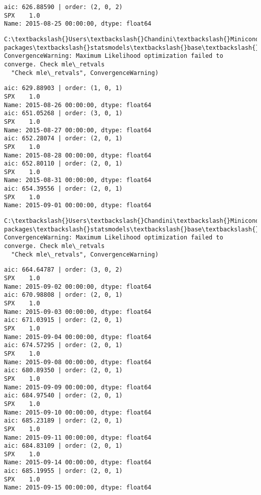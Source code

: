 \documentclass[11pt]{article}
\begin{document}
    \begin{Verbatim}[commandchars=\\\{\}]
aic: 626.88590 | order: (2, 0, 2)
SPX    1.0
Name: 2015-08-25 00:00:00, dtype: float64

    \end{Verbatim}

    \begin{Verbatim}[commandchars=\\\{\}]
C:\textbackslash{}Users\textbackslash{}Chandini\textbackslash{}Miniconda3\textbackslash{}envs\textbackslash{}auquan\textbackslash{}lib\textbackslash{}site-packages\textbackslash{}statsmodels\textbackslash{}base\textbackslash{}model.py:496: ConvergenceWarning: Maximum Likelihood optimization failed to converge. Check mle\_retvals
  "Check mle\_retvals", ConvergenceWarning)

    \end{Verbatim}

    \begin{Verbatim}[commandchars=\\\{\}]
aic: 629.88903 | order: (1, 0, 1)
SPX    1.0
Name: 2015-08-26 00:00:00, dtype: float64
aic: 651.05268 | order: (3, 0, 1)
SPX    1.0
Name: 2015-08-27 00:00:00, dtype: float64
aic: 652.28074 | order: (2, 0, 1)
SPX    1.0
Name: 2015-08-28 00:00:00, dtype: float64
aic: 652.80110 | order: (2, 0, 1)
SPX    1.0
Name: 2015-08-31 00:00:00, dtype: float64
aic: 654.39556 | order: (2, 0, 1)
SPX    1.0
Name: 2015-09-01 00:00:00, dtype: float64

    \end{Verbatim}

    \begin{Verbatim}[commandchars=\\\{\}]
C:\textbackslash{}Users\textbackslash{}Chandini\textbackslash{}Miniconda3\textbackslash{}envs\textbackslash{}auquan\textbackslash{}lib\textbackslash{}site-packages\textbackslash{}statsmodels\textbackslash{}base\textbackslash{}model.py:496: ConvergenceWarning: Maximum Likelihood optimization failed to converge. Check mle\_retvals
  "Check mle\_retvals", ConvergenceWarning)

    \end{Verbatim}

    \begin{Verbatim}[commandchars=\\\{\}]
aic: 664.64787 | order: (3, 0, 2)
SPX    1.0
Name: 2015-09-02 00:00:00, dtype: float64
aic: 670.98808 | order: (2, 0, 1)
SPX    1.0
Name: 2015-09-03 00:00:00, dtype: float64
aic: 671.03915 | order: (2, 0, 1)
SPX    1.0
Name: 2015-09-04 00:00:00, dtype: float64
aic: 674.57295 | order: (2, 0, 1)
SPX    1.0
Name: 2015-09-08 00:00:00, dtype: float64
aic: 680.89350 | order: (2, 0, 1)
SPX    1.0
Name: 2015-09-09 00:00:00, dtype: float64
aic: 684.97540 | order: (2, 0, 1)
SPX    1.0
Name: 2015-09-10 00:00:00, dtype: float64
aic: 685.23189 | order: (2, 0, 1)
SPX    1.0
Name: 2015-09-11 00:00:00, dtype: float64
aic: 684.83109 | order: (2, 0, 1)
SPX    1.0
Name: 2015-09-14 00:00:00, dtype: float64
aic: 685.19955 | order: (2, 0, 1)
SPX    1.0
Name: 2015-09-15 00:00:00, dtype: float64

    \end{Verbatim}
\end{document}
